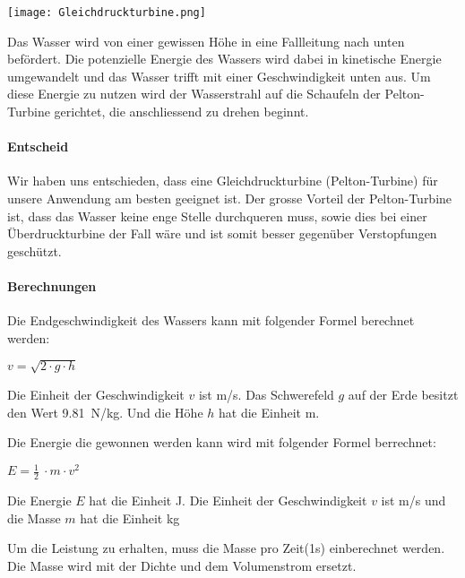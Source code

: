 \begin{center}
\texttt{[image: Gleichdruckturbine.png]}
\end{center}

Das Wasser wird von einer gewissen Höhe in eine Fallleitung nach unten befördert. Die potenzielle Energie des Wassers wird dabei in kinetische Energie umgewandelt und das Wasser trifft mit einer Geschwindigkeit unten aus. Um diese Energie zu nutzen wird der Wasserstrahl auf die Schaufeln der Pelton-Turbine gerichtet, die anschliessend zu drehen beginnt. 

\paragraph{Entscheid}

Wir haben uns entschieden, dass eine Gleichdruckturbine (Pelton-Turbine) für unsere Anwendung am besten geeignet ist. Der grosse Vorteil der Pelton-Turbine ist, dass das Wasser keine enge Stelle durchqueren muss, sowie dies bei einer Überdruckturbine der Fall wäre und ist somit besser gegenüber Verstopfungen geschützt.

\bigskip

\paragraph{Berechnungen}

Die Endgeschwindigkeit des Wassers kann mit folgender Formel berechnet werden:
\begin{center}
\(v = \sqrt{2 \cdot g \cdot h} \)
\end{center}

Die Einheit der Geschwindigkeit \(v\) ist \si{m/s}. Das Schwerefeld \(g\) auf der Erde besitzt den Wert 9.81~\si{N/kg}. Und die Höhe \(h\) hat die Einheit \si{m}.

\bigskip

Die Energie die gewonnen werden kann wird mit folgender Formel berrechnet:

\begin{center}
\(E =\frac 12\ \cdot m \cdot v^2\)
\end{center}

Die Energie \(E\) hat die Einheit \si{J}. Die Einheit der Geschwindigkeit \(v\) ist \si{m/s} und die Masse \(m\) hat die Einheit \si{kg}

\newpage

Um die Leistung zu erhalten, muss die Masse pro Zeit(1s) einberechnet werden. Die Masse wird  mit der Dichte und dem Volumenstrom ersetzt.

